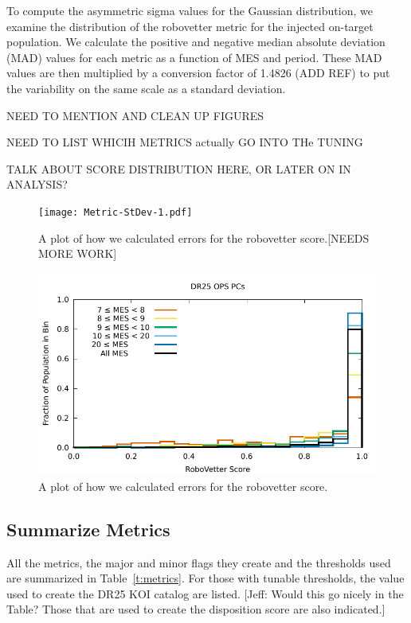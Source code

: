 To compute the asymmetric sigma values for the Gaussian distribution, we examine the distribution of the robovetter metric for the injected on-target population. We calculate the positive and negative median absolute deviation (MAD) values for each metric as a function of MES and period. These MAD values are then multiplied by a conversion factor of 1.4826 (ADD REF) to put the variability on the same scale as a standard deviation.

NEED TO MENTION AND CLEAN UP FIGURES

NEED TO LIST WHICIH METRICS actually GO INTO THe TUNING

TALK ABOUT SCORE DISTRIBUTION HERE, OR LATER ON IN ANALYSIS?

\begin{figure}
\centering
\texttt{[image: Metric-StDev-1.pdf]}
\caption{A plot of how we calculated errors for the robovetter score.[NEEDS MORE WORK]}
\label{score-fig-1}
\end{figure}

\begin{figure}
\centering
\includegraphics[width=\linewidth]{Scores-1.pdf}
\caption{A plot of how we calculated errors for the robovetter score.}
\label{score-fig-2}
\end{figure}

\subsection{Summarize Metrics}
All the metrics, the major and minor flags they create and the thresholds used are summarized in Table~\ref{t:metrics}. For those with tunable thresholds, the value used to create the DR25 KOI catalog are listed.  [Jeff: Would this go nicely in the Table?  Those that are used to create the disposition score are also indicated.]


